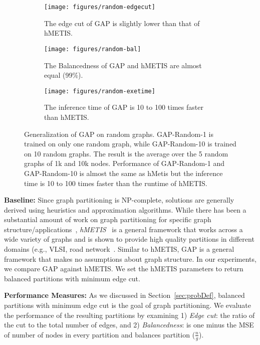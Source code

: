 \documentclass[10pt,twocolumn]{article}
\begin{document}
\begin{figure*}[h]
    \centering
    \begin{subfigure}{0.3\textwidth}
        \texttt{[image: figures/random-edgecut]}
        \caption{\small{The edge cut of GAP is slightly lower than that of hMETIS.}}
        \label{fig:random-edgecut}
    \end{subfigure}
    \hspace{1mm}
    \begin{subfigure}{0.3\textwidth}
        \texttt{[image: figures/random-bal]}
        \caption{\small{The Balancedness of GAP and hMETIS are almost equal (99\%).}}
        \label{fig:random-bal}
    \end{subfigure}
    \hspace{1mm}
    \begin{subfigure}{0.3\textwidth}
        \texttt{[image: figures/random-exetime]}
        \caption{\small{The inference time of GAP is 10 to 100 times faster than hMETIS.}}
        \label{fig:random-exetime}
    \end{subfigure}
\caption{Generalization of GAP on random graphs. GAP-Random-1 is trained on only one random graph, while GAP-Random-10 is trained on 10 random graphs. The result is the average over the 5 random graphs of 1k and 10k nodes. Performance of GAP-Random-1 and GAP-Random-10 is almost the same as hMetis but the inference time is 10 to 100 times faster than the runtime of hMETIS.}
    \label{fig:random}
\end{figure*}

\noindent\textbf{Baseline:} Since graph partitioning is NP-complete, solutions are generally derived using heuristics and approximation algorithms. While there has been a substantial amount of work on graph partitioning for specific graph structure/applications~\cite{gonzalez2012powergraph, hada2018}, \emph{hMETIS}~\cite{karypis_2000, karypis_1999} is a general framework that works across a wide variety of graphs and is shown to provide high quality partitions in different domains (e.g., VLSI, road network~\cite{miettinen_2006, xu2012hmetis}. Similar to hMETIS, GAP is a general framework that makes no assumptions about graph structure. In our experiments, we compare GAP against hMETIS. We set the hMETIS parameters to return balanced partitions with minimum edge cut.

\noindent\textbf{Performance Measures:} As we discussed in Section~\ref{sec:probDef}, balanced partitions with minimum edge cut is the goal of graph partitioning. We evaluate the performance of the resulting partitions by examining 1) \emph{Edge cut}: the ratio of the cut to the total number of edges, and 2) \emph{Balancedness}: is one minus the MSE of number of nodes in every partition and balances partition ($\frac{n}{g}$).
\end{document}

